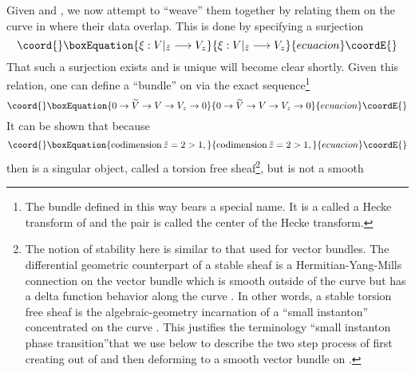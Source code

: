 \documentclass[a4paper,12pt]{article}
\numberwithin{equation}{section}
\theoremstyle{plain}
\begin{document}
Given \coordHE{} and \coordHE{}, we now attempt to ``weave'' them
together by relating them on the curve \coordHE{} in \coordHE{} where their
data overlap. This is done by specifying a
surjection
\begin{equation}\coord{}\boxEquation{
\xi:V|_{\tilde{z}} \longrightarrow V_{z}
\label{eq:63}
}{
\xi:V|_{\tilde{z}} \longrightarrow V_{z}
}{ecuacion}\coordE{}\end{equation}
That such a surjection exists and is unique will become clear shortly. Given
this relation, one can define a ``bundle'' \coordHE{} on \coordHE{} via the
exact sequence\footnote{The bundle \coordHE{} defined in this 
way bears a special name. It is a called a Hecke transform of \coordHE{} and the pair 
\coordHE{} is called the center of the Hecke transform.}
\begin{equation}\coord{}\boxEquation{
0 \rightarrow \widetilde{V} \rightarrow V \rightarrow V_{z}
\rightarrow 0
\label{eq:64}
}{
0 \rightarrow \widetilde{V} \rightarrow V \rightarrow V_{z}
\rightarrow 0
}{ecuacion}\coordE{}\end{equation}
It can be shown that because
\begin{equation}\coord{}\boxEquation{
\operatorname{codimension}   \tilde{z}= 2 > 1,
\label{eq:65}
}{
\operatorname{codimension}   \tilde{z}= 2 > 1,
}{ecuacion}\coordE{}\end{equation}
then \coordHE{} is a singular object, 
called a torsion free sheaf\footnote{The notion of stability here is similar
to that used for vector bundles. The differential geometric counterpart of
a stable sheaf \coordHE{} is a Hermitian-Yang-Mills
connection \coordHE{} on the vector
bundle \coordHE{} which is smooth outside of the curve \coordHE{}
but has a delta function behavior along the curve \coordHE{}. In
other words, a stable torsion free sheaf \coordHE{} is the
algebraic-geometry incarnation of a ``small instanton''
concentrated on the curve \coordHE{}. This justifies the terminology
``small instanton phase transition''that we use below to describe the
two step process of first creating \coordHE{} out of \coordHE{} and then
deforming \coordHE{} to a smooth vector bundle \coordHE{} on
\coordHE{}.}, but is not a smooth
\end{document}
